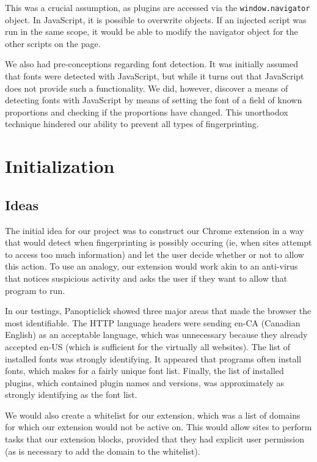 \documentclass[12pt,a4paper]{article}
\begin{document}
This was a crucial assumption, as plugins are accessed via the \texttt{window.navigator} object. In JavaScript, it is possible to overwrite objects. If an injected script was run in the same scope, it would be able to modify the navigator object for the other scripts on the page.

We also had pre-conceptions regarding font detection. It was initially assumed that fonts were detected with JavaScript, but while it turns out that JavaScript does not provide such a functionality. We did, however, discover a means of detecting fonts with JavaScript by means of setting the font of a field of known proportions and checking if the proportions have changed. This unorthodox technique hindered our ability to prevent all types of fingerprinting.

\section{Initialization}

\subsection{Ideas}
The initial idea for our project was to construct our Chrome extension in a way that would detect when fingerprinting is possibly occuring (ie, when sites attempt to access too much information) and let the user decide whether or not to allow this action. To use an analogy, our extension would work akin to an anti-virus that notices suspicious activity and asks the user if they want to allow that program to run.

In our testings, Panopticlick showed three major areas that made the browser the most identifiable. The HTTP language headers were sending en-CA (Canadian English) as an acceptable language, which was unnecessary because they already accepted en-US (which is sufficient for the virtually all websites). The list of installed fonts was strongly identifying. It appeared that programs often install fonts, which makes for a fairly unique font list. Finally, the list of installed plugins, which contained plugin names and versions, was approximately as strongly identifying as the font list.

We would also create a whitelist for our extension, which was a list of domains for which our extension would not be active on. This would allow sites to perform tasks that our extension blocks, provided that they had explicit user permission (as is necessary to add the domain to the whitelist).
\end{document}
